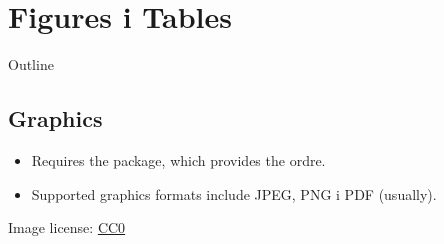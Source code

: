 \documentclass{beamer}
\begin{document}
\section{Figures i Tables}

\begin{frame}{Outline}
\begin{multicols}{2}
\tableofcontents[currentsection]
\end{multicols}
\end{frame}

\subsection{Graphics}
\begin{frame}[fragile]{\insertsubsection}
\begin{itemize}
\item Requires the  package, which provides the
 ordre.
\item Supported graphics formats include JPEG, PNG i PDF (usually).
\end{itemize}

\tiny{Image license: \href{https://pixabay.com/en/animal-apple-attractive-beautiful-1239390/}{CC0}}
\end{frame}
\end{document}
